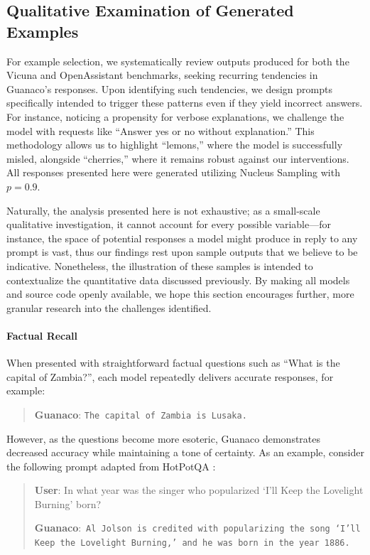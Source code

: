 \subsection{Qualitative Examination of Generated Examples}
\label{ssec:examples}

For example selection, we systematically review outputs produced for both the Vicuna and OpenAssistant benchmarks, seeking recurring tendencies in {Guanaco}'s responses. Upon identifying such tendencies, we design prompts specifically intended to trigger these patterns even if they yield incorrect answers. For instance, noticing a propensity for verbose explanations, we challenge the model with requests like ``Answer yes or no without explanation.'' This methodology allows us to highlight ``lemons,'' where the model is successfully misled, alongside ``cherries,'' where it remains robust against our interventions. All responses presented here were generated utilizing Nucleus Sampling \cite{holtzmancurious} with $p=0.9$.

Naturally, the analysis presented here is not exhaustive; as a small-scale qualitative investigation, it cannot account for every possible variable—for instance, the space of potential responses a model might produce in reply to any prompt is vast, thus our findings rest upon sample outputs that we believe to be indicative. Nonetheless, the illustration of these samples is intended to contextualize the quantitative data discussed previously. By making all models and source code openly available, we hope this section encourages further, more granular research into the challenges identified.

\paragraph{Factual Recall} When presented with straightforward factual questions such as ``What is the capital of Zambia?'', each model repeatedly delivers accurate responses, for example:

\begin{quote} 
    \textbf{Guanaco}:
    \texttt{The capital of Zambia is Lusaka.}
\end{quote}

 However, as the questions become more esoteric, {Guanaco} demonstrates decreased accuracy while maintaining a tone of certainty. As an example, consider the following prompt adapted from HotPotQA \citep{yang2018hotpotqa}:

\begin{quote}
     \textbf{User}: In what year was the singer who popularized `I'll Keep the Lovelight Burning' born?  

     \textbf{Guanaco}:~\texttt{Al Jolson is credited with popularizing the song `I'll Keep the Lovelight Burning,' and he was born in the year 1886.}
 \end{quote}

